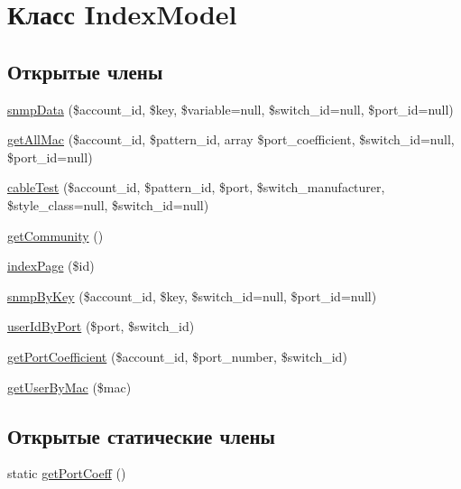 \hypertarget{class_index_model}{\section{Класс Index\-Model}
\label{class_index_model}
}
\subsection*{Открытые члены}
\begin{DoxyCompactItemize}
\item 
\hyperlink{class_index_model_a5cdd544cd52782642a0f42334acdb531}{snmp\-Data} (\$account\-\_\-id, \$key, \$variable=null, \$switch\-\_\-id=null, \$port\-\_\-id=null)
\item 
\hyperlink{class_index_model_a395d66b37a253bab5365dbee626e7dbd}{get\-All\-Mac} (\$account\-\_\-id, \$pattern\-\_\-id, array \$port\-\_\-coefficient, \$switch\-\_\-id=null, \$port\-\_\-id=null)
\item 
\hyperlink{class_index_model_a92cfbe87f525727795f818072f74bb16}{cable\-Test} (\$account\-\_\-id, \$pattern\-\_\-id, \$port, \$switch\-\_\-manufacturer, \$style\-\_\-class=null, \$switch\-\_\-id=null)
\item 
\hyperlink{class_index_model_a1fce7d860847195080702dd2174e198c}{get\-Community} ()
\item 
\hyperlink{class_index_model_a99d3df1e9eea9f8bbe8be04067299e1c}{index\-Page} (\$id)
\item 
\hyperlink{class_index_model_afcec9844f30bbb9cdaf48fac789e1d7b}{snmp\-By\-Key} (\$account\-\_\-id, \$key, \$switch\-\_\-id=null, \$port\-\_\-id=null)
\item 
\hyperlink{class_index_model_ad90f0c96df11bdd429c62fa31cf226e3}{user\-Id\-By\-Port} (\$port, \$switch\-\_\-id)
\item 
\hyperlink{class_index_model_ae8029f54b6dbca39a2c9c8c80e5d24d1}{get\-Port\-Coefficient} (\$account\-\_\-id, \$port\-\_\-number, \$switch\-\_\-id)
\item 
\hyperlink{class_index_model_ad0fb7f4d93efd7678f7136d32990ee6f}{get\-User\-By\-Mac} (\$mac)
\end{DoxyCompactItemize}
\subsection*{Открытые статические члены}
\begin{DoxyCompactItemize}
\item 
static \hyperlink{class_index_model_ab17dd49d3409d5f198dffea22b33bce2}{get\-Port\-Coeff} ()
\end{DoxyCompactItemize}



